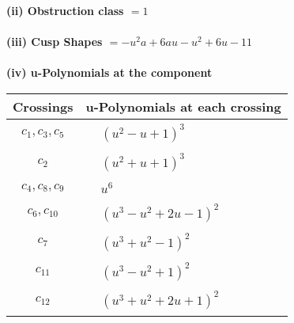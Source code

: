 \documentclass[1p]{elsarticle_modified}
\theoremstyle{definition}
\begin{document}
\flushleft \textbf{(ii) Obstruction class $= 1$}\\~\\
\flushleft \textbf{(iii) Cusp Shapes $= - u^2 a+6 a u- u^2+6 u-11$}\\~\\
\newpage\renewcommand{\arraystretch}{1}
\flushleft \textbf{(iv) u-Polynomials at the component}\newline \\
\begin{tabular}{m{50pt}|m{274pt}}
Crossings & \hspace{64pt}u-Polynomials at each crossing \\
\hline $$\begin{aligned}c_{1},c_{3},c_{5}\end{aligned}$$&$\begin{aligned}
&(u^2- u+1)^3
\end{aligned}$\\
\hline $$\begin{aligned}c_{2}\end{aligned}$$&$\begin{aligned}
&(u^2+u+1)^3
\end{aligned}$\\
\hline $$\begin{aligned}c_{4},c_{8},c_{9}\end{aligned}$$&$\begin{aligned}
&u^6
\end{aligned}$\\
\hline $$\begin{aligned}c_{6},c_{10}\end{aligned}$$&$\begin{aligned}
&(u^3- u^2+2 u-1)^2
\end{aligned}$\\
\hline $$\begin{aligned}c_{7}\end{aligned}$$&$\begin{aligned}
&(u^3+u^2-1)^2
\end{aligned}$\\
\hline $$\begin{aligned}c_{11}\end{aligned}$$&$\begin{aligned}
&(u^3- u^2+1)^2
\end{aligned}$\\
\hline $$\begin{aligned}c_{12}\end{aligned}$$&$\begin{aligned}
&(u^3+u^2+2 u+1)^2
\end{aligned}$\\
\hline
\end{tabular}\\~\\
\end{document}

